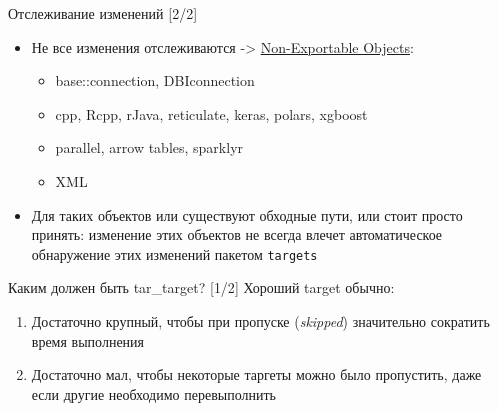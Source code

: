 \documentclass[
  ignorenonframetext,
]{beamer}
\begin{document}
\begin{frame}[fragile]{Отслеживание изменений {[}2/2{]}}
\label{ux43eux442ux441ux43bux435ux436ux438ux432ux430ux43dux438ux435-ux438ux437ux43cux435ux43dux435ux43dux438ux439-22}
\begin{itemize}
\item
  Не все изменения отслеживаются -\textgreater{}
  \href{https://cran.r-project.org/web/packages/future/vignettes/future-4-non-exportable-objects.html}{Non-Exportable
  Objects}:

  \begin{itemize}
  \item
    base::connection, DBIconnection
  \item
    cpp, Rcpp, rJava, reticulate, keras, polars, xgboost
  \item
    parallel, arrow tables, sparklyr
  \item
    XML
  \end{itemize}
\item
  Для таких объектов или существуют обходные пути, или стоит просто
  принять: изменение этих объектов не всегда влечет автоматическое
  обнаружение этих изменений пакетом \texttt{targets}
\end{itemize}
\end{frame}

\begin{frame}{Каким должен быть tar\_target? {[}1/2{]}}
\label{ux43aux430ux43aux438ux43c-ux434ux43eux43bux436ux435ux43d-ux431ux44bux442ux44c-tar_target-12}
Хороший target обычно:

\begin{enumerate}
\item
  Достаточно крупный, чтобы при пропуске (\emph{skipped}) значительно
  сократить время выполнения
\item
  Достаточно мал, чтобы некоторые таргеты можно было пропустить, даже
  если другие необходимо перевыполнить
\end{enumerate}
\end{frame}
\end{document}
